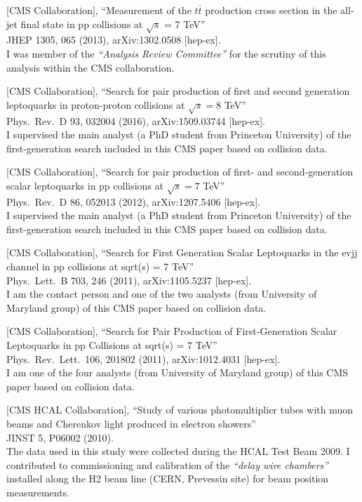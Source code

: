 \documentclass[10pt, a4paper]{article}
\begin{document}
\begin{thebibliography}{599}
[CMS Collaboration],
  ``Measurement of the $t\bar{t}$ production cross section in the all-jet final state in pp collisions at $\sqrt{s}$ = 7 TeV''\\
  JHEP 1305, 065 (2013), arXiv:1302.0508 [hep-ex].
  \\ I was member of the {\it``Analysis Review Committee''} for the scrutiny of this analysis within the CMS collaboration. 

[CMS Collaboration],
``Search for pair production of first and second generation
  leptoquarks in proton-proton collisions at $\sqrt{s}=8$ TeV''\\
  Phys.\ Rev.\ D  93, 032004 (2016), arXiv:1509.03744 [hep-ex].
\\I supervised the main analyst (a PhD student from Princeton University) of the first-generation search included in this CMS paper based on collision data. 

[CMS Collaboration],
``Search for pair production of first- and second-generation scalar leptoquarks in pp collisions at $\sqrt{s}= 7$ TeV''\\
Phys.\ Rev.\ D 86, 052013 (2012), arXiv:1207.5406 [hep-ex]. 
\\I supervised the main analyst (a PhD student from Princeton University) of the first-generation search included in this CMS paper based on collision data. 

[CMS Collaboration],
 ``Search for First Generation Scalar Leptoquarks in the evjj channel in pp collisions at sqrt(s) = 7 TeV''\\
  Phys.\ Lett.\ B 703, 246 (2011), arXiv:1105.5237 [hep-ex].
  \\ I am the contact person and one of the two analysts (from University of Maryland group) of this CMS paper based on collision data.

[CMS Collaboration],
``Search for Pair Production of First-Generation Scalar Leptoquarks in pp Collisions at sqrt(s) = 7 TeV''\\
Phys.\ Rev.\ Lett.\  106, 201802 (2011), arXiv:1012.4031 [hep-ex].
\\I am one of the four analysts (from University of Maryland group) of this CMS paper based on collision data.

[CMS HCAL Collaboration],
``Study of various photomultiplier tubes with muon beams and Cherenkov light produced in electron showers''\\
 JINST 5, P06002 (2010).
  \\ The data used in this study were collected during the HCAL Test Beam 2009. I contributed to 
  commissioning and calibration of the {\it ``delay wire chambers''} installed along the H2 
  beam line (CERN, Prevessin site) for beam position measurements.


\end{thebibliography}
\end{document}

